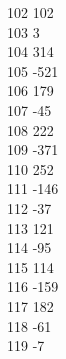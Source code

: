 { 102	102 \\
 103	3 \\
 104	314 \\
 105	-521 \\
 106	179 \\
 107	-45 \\
 108	222 \\
 109	-371 \\
 110	252 \\
 111	-146 \\
 112	-37 \\
 113	121 \\
 114	-95 \\
 115	114 \\
 116	-159 \\
 117	182 \\
 118	-61 \\
 119	-7 \\
}
